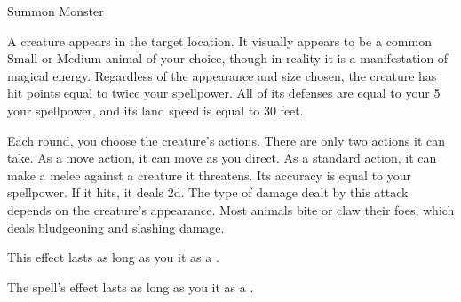 \newpage
\begin{spellsection}{Summon Monster}

\begin{spellheader}
\end{spellheader}

\begin{spellcontent}

\begin{spelltargetinginfo}




\end{spelltargetinginfo}


\begin{spelleffects}



\spelleffect
A creature appears in the target location.
It visually appears to be a common Small or Medium animal of your choice, though in reality it is a manifestation of magical energy.
Regardless of the appearance and size chosen, the creature has hit points equal to twice your spellpower.
All of its defenses are equal to your 5 \add your spellpower, and its land speed is equal to 30 feet.

Each round, you choose the creature's actions.
There are only two actions it can take.
As a move action, it can move as you direct.
As a standard action, it can make a melee  against a creature it threatens.
Its accuracy is equal to your spellpower.
If it hits, it deals  \minus2d.
The type of damage dealt by this attack depends on the creature's appearance.
Most animals bite or claw their foes, which deals bludgeoning and slashing damage.

This effect lasts as long as you  it as a .








\end{spelleffects}

\end{spellcontent}
\begin{spellfooter}


\end{spellfooter}
\begin{spellsubcontent}


\begin{spellcantrip}
The spell's effect lasts as long as you  it as a .
\end{spellcantrip}


\end{spellsubcontent}
\end{spellsection}


